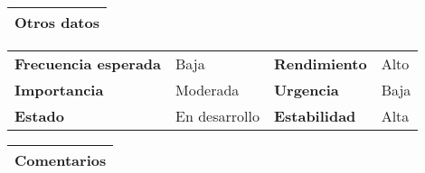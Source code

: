 \documentclass[11pt,a4paper]{article}
\begin{document}
\begin{table}[H]
	\begin{tabularx}{\textwidth}{X}
		\textbf{Otros datos}\\ \hline
	\end{tabularx}

	\begin{tabularx}{\textwidth}{lXlX}
		\textbf{Frecuencia esperada} & Baja & \textbf{Rendimiento} & Alto\\
		\textbf{Importancia} & Moderada & \textbf{Urgencia} & Baja\\
		\textbf{Estado} & En desarrollo & \textbf{Estabilidad} & Alta\\
	\end{tabularx}
	
	\begin{tabularx}{\textwidth}{X}
		\textbf{Comentarios}\\ \hline
	\end{tabularx}
\end{table}

\newpage


\end{document}
